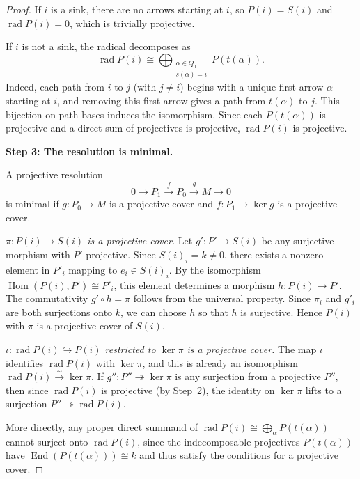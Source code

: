 \documentclass[11pt, a4paper]{article}
\begin{document}
\begin{enumerate}[leftmargin=*, label=\textbf{\arabic*.}]
\begin{proof}
    If $i$ is a sink, there are no arrows starting at $i$, so $P(i)=S(i)$ and $\operatorname{rad}P(i)=0$, which is trivially projective.
    
    If $i$ is not a sink, the radical decomposes as
    \[
    \operatorname{rad}P(i)\cong \bigoplus_{\substack{\alpha\in Q_1\\ s(\alpha)=i}} P(t(\alpha)).
    \]
    Indeed, each path from $i$ to $j$ (with $j\neq i$) begins with a unique first arrow $\alpha$ starting at $i$, and removing this first arrow gives a path from $t(\alpha)$ to $j$. This bijection on path bases induces the isomorphism. Since each $P(t(\alpha))$ is projective and a direct sum of projectives is projective, $\operatorname{rad}P(i)$ is projective.
    
    \medskip\noindent\textbf{Step 3: The resolution is minimal.}
    
    A projective resolution
    \[
    0 \longrightarrow P_1 \xrightarrow{\;f\;} P_0 \xrightarrow{\;g\;} M \longrightarrow 0
    \]
    is minimal if $g\colon P_0\to M$ is a projective cover and $f\colon P_1\to\ker g$ is a projective cover.
    
    \emph{$\pi\colon P(i)\to S(i)$ is a projective cover.} Let $g'\colon P'\to S(i)$ be any surjective morphism with $P'$ projective. Since $S(i)_i=k\neq 0$, there exists a nonzero element in $P'_i$ mapping to $e_i\in S(i)_i$. By the isomorphism $\operatorname{Hom}(P(i),P')\cong P'_i$, this element determines a morphism $h\colon P(i)\to P'$. The commutativity $g'\circ h=\pi$ follows from the universal property. Since $\pi_i$ and $g'_i$ are both surjections onto $k$, we can choose $h$ so that $h$ is surjective. Hence $P(i)$ with $\pi$ is a projective cover of $S(i)$.
    
    \emph{$\iota\colon\operatorname{rad}P(i)\hookrightarrow P(i)$ restricted to $\ker\pi$ is a projective cover.} The map $\iota$ identifies $\operatorname{rad}P(i)$ with $\ker\pi$, and this is already an isomorphism $\operatorname{rad}P(i)\xrightarrow{\sim}\ker\pi$. If $g''\colon P''\twoheadrightarrow\ker\pi$ is any surjection from a projective $P''$, then since $\operatorname{rad}P(i)$ is projective (by Step~2), the identity on $\ker\pi$ lifts to a surjection $P''\twoheadrightarrow\operatorname{rad}P(i)$.
    
    More directly, any proper direct summand of $\operatorname{rad}P(i)\cong\bigoplus_\alpha P(t(\alpha))$ cannot surject onto $\operatorname{rad}P(i)$, since the indecomposable projectives $P(t(\alpha))$ have $\operatorname{End}(P(t(\alpha)))\cong k$ and thus satisfy the conditions for a projective cover.
    

\end{proof}
\end{enumerate}
\end{document}
